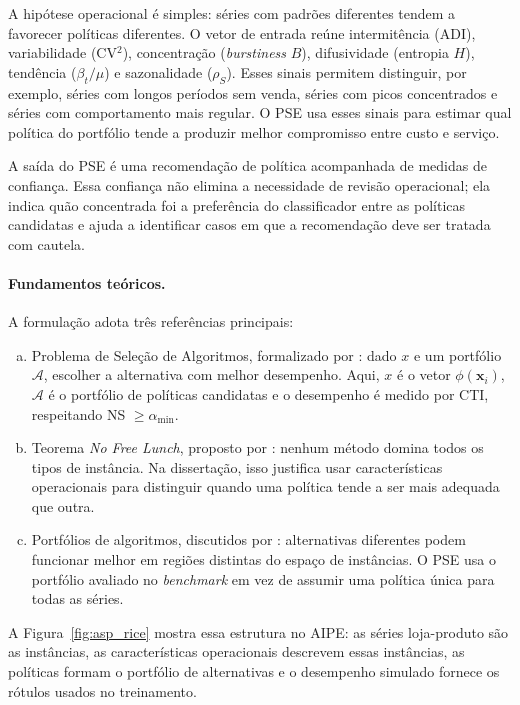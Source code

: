 A hipótese operacional é simples: séries com padrões diferentes tendem a favorecer políticas diferentes. O vetor de entrada reúne intermitência (ADI), variabilidade (CV$^2$), concentração (\textit{burstiness} $B$), difusividade (entropia $H$), tendência ($\beta_t/\mu$) e sazonalidade ($\rho_S$). Esses sinais permitem distinguir, por exemplo, séries com longos períodos sem venda, séries com picos concentrados e séries com comportamento mais regular. O PSE usa esses sinais para estimar qual política do portfólio tende a produzir melhor compromisso entre custo e serviço.

A saída do PSE é uma recomendação de política acompanhada de medidas de confiança. Essa confiança não elimina a necessidade de revisão operacional; ela indica quão concentrada foi a preferência do classificador entre as políticas candidatas e ajuda a identificar casos em que a recomendação deve ser tratada com cautela.

\paragraph{Fundamentos teóricos.} A formulação adota três referências principais:

\begin{enumerate}[(a)]
  \item Problema de Seleção de Algoritmos, formalizado por \citet{Rice1976AlgorithmSelection}: dado $x$ e um portfólio $\mathcal{A}$, escolher a alternativa com melhor desempenho. Aqui, $x$ é o vetor $\phi(\mathbf{x}_i)$, $\mathcal{A}$ é o portfólio de políticas candidatas e o desempenho é medido por CTI, respeitando NS $\geq \alpha_{\min}$.
  \item Teorema \textit{No Free Lunch}, proposto por \citet{Wolpert1997NoFreeLunch}: nenhum método domina todos os tipos de instância. Na dissertação, isso justifica usar características operacionais para distinguir quando uma política tende a ser mais adequada que outra.
  \item Portfólios de algoritmos, discutidos por \citet{Huberman1997AlgorithmPortfolios}: alternativas diferentes podem funcionar melhor em regiões distintas do espaço de instâncias. O PSE usa o portfólio avaliado no \textit{benchmark} em vez de assumir uma política única para todas as séries.
\end{enumerate}

A Figura~\ref{fig:asp_rice} mostra essa estrutura no AIPE: as séries loja-produto são as instâncias, as características operacionais descrevem essas instâncias, as políticas formam o portfólio de alternativas e o desempenho simulado fornece os rótulos usados no treinamento.

